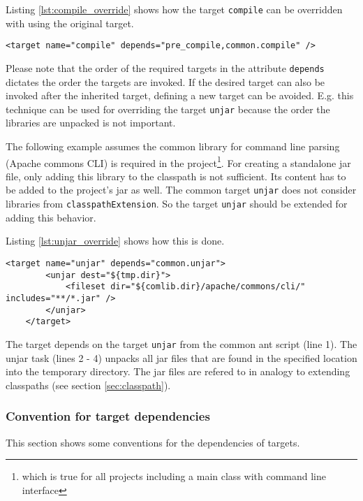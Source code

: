 \documentclass[a4paper,twoside,11pt,bibtotoc]{article}
\begin{document}
Listing \ref{lst:compile_override} shows how the target \texttt{compile} can be overridden with using the original target.

\begin{lstlisting}[caption=Overriding the target \texttt{compile},label=lst:compile_override,float=!ht,language=ant]
	<target name="compile" depends="pre_compile,common.compile" />
\end{lstlisting}

Please note that the order of the required targets in the attribute \texttt{depends} dictates the order the targets are invoked.
If the desired target can also be invoked after the inherited target, defining a new target can be avoided.
E.g. this technique can be used for overriding the target \texttt{unjar} because the order the libraries are unpacked is not important.

The following example assumes the common library for command line parsing (Apache commons CLI) is required in the project\footnote{which is true for all projects including a main class with command line interface}.
For creating a standalone jar file, only adding this library to the classpath is not sufficient.
Its content has to be added to the project's jar as well.
The common target \texttt{unjar} does not consider libraries from \texttt{classpathExtension}.
So the target \texttt{unjar} should be extended for adding this behavior.

Listing \ref{lst:unjar_override} shows how this is done.

\begin{lstlisting}[caption=Overriding the target \texttt{unjar},label=lst:unjar_override,float=!ht,language=ant]
	<target name="unjar" depends="common.unjar">
		<unjar dest="${tmp.dir}">
			<fileset dir="${comlib.dir}/apache/commons/cli/" includes="**/*.jar" />
		</unjar>
	</target>
\end{lstlisting}

The target depends on the target \texttt{unjar} from the common ant script (line 1).
The unjar task (lines 2 - 4) unpacks all jar files that are found in the specified location into the temporary directory.
The jar files are refered to in analogy to extending classpaths (see section \ref{sec:classpath}).

\subsubsection{Convention for target dependencies}
\label{sec:target:conventions}
This section shows some conventions for the dependencies of targets.
\end{document}
